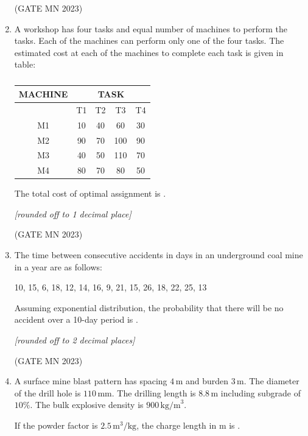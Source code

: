 \documentclass[journal]{IEEEtran}
\begin{document}
\begin{enumerate}
\hfill(GATE MN 2023)
\item A workshop has four tasks and equal number of machines to perform the tasks.  
Each of the machines can perform only one of the four tasks. The estimated cost at each of the machines to complete each task is given in table:  


\begin{table}[H]
\centering\normalsize
\begin{tabular}{|c|c|c|c|c|}
\hline
\textbf{MACHINE} & \multicolumn{4}{c|}{\textbf{TASK}} \\ \hline
& T1 & T2 & T3 & T4 \\ \hline
M1 & 10 & 40 & 60 & 30 \\ \hline
M2 & 90 & 70 & 100 & 90 \\ \hline
M3 & 40 & 50 & 110 & 70 \\ \hline
M4 & 80 & 70 & 80 & 50 \\ \hline
\end{tabular}
	\caption{}
	\label{tab:Q58}
\end{table}



The total cost of optimal assignment is \underline{\hspace{2cm}}.  

\textit{[rounded off to 1 decimal place]}  



\hfill(GATE MN 2023)
\item The time between consecutive accidents in days in an underground coal mine in a year are as follows:  

10, 15, 6, 18, 12, 14, 16, 9, 21, 15, 26, 18, 22, 25, 13  

Assuming exponential distribution, the probability that there will be no accident over a 10-day period is \underline{\hspace{2cm}}.  

\textit{[rounded off to 2 decimal places]}  



\hfill(GATE MN 2023)
\item A surface mine blast pattern has spacing $4 \, \text{m}$ and burden $3 \, \text{m}$.  
The diameter of the drill hole is $110 \, \text{mm}$. The drilling length is $8.8 \, \text{m}$ including subgrade of $10\%$.  
The bulk explosive density is $900 \,\text{kg/m}^3$.  

If the powder factor is $2.5 \,\text{m}^3/\text{kg}$, the charge length in m is \underline{\hspace{2cm}}.  


\end{enumerate}
\end{document}
